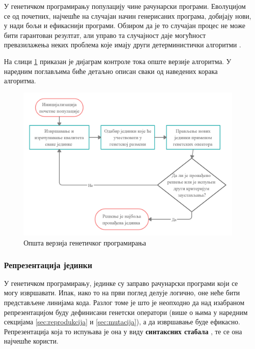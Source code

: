 \documentclass[a4paper]{article}
\begin{document}
У генетичком програмирању популацију чине рачунарски програми. Еволуцијом се од почетних, најчешће на случајан начин генерисаних програма, добијају нови, у нади бољи и ефикаснији програми. Обзиром да је то случајан процес не може бити гарантован резултат, али управо та случајност даје могућност превазилажења неких проблема које имају други детерминистички алгоритми \cite{fieldGuidetoGP}. 

На слици \ref{fig:kontrola_toka} приказан је дијаграм контроле тока опште верзије алгоритма. У наредним поглављима биће детаљно описан сваки од наведених корака алгоритма.

\begin{figure}[h!]
    \begin{center}
        \includegraphics[scale=0.22]{opstiAlgoritam.png}
    \end{center}
    \caption{Општа верзија генетичког програмирања}
    \label{fig:kontrola_toka}
\end{figure}

\subsubsection{Репрезентација јединки}

У генетичком програмирању, јединке су заправо рачунарски програми који се могу извршавати. Ипак, иако то на први поглед делује логично, оне неће бити представљене линијама кода. Разлог томе је што је неопходно да над изабраном репрезентацијом буду дефинисани генетски оператори (више о њима у наредним секцијама \ref{sec:reprodukcija} и \ref{sec:mutacija}), а да извршавање буде ефикасно. Репрезентација која то испуњава је она у виду \textbf{синтаксних стабала} \cite{synTrees}, те се она најчешће користи.
\end{document}
